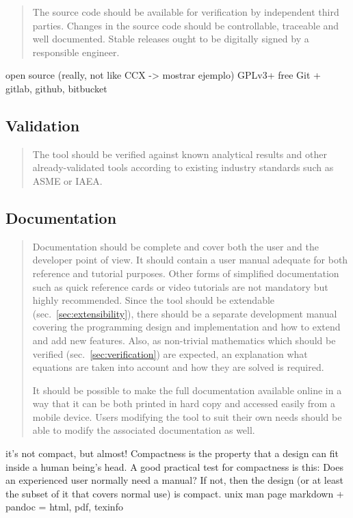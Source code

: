 \documentclass[
  american,
]{article}
\begin{document}
\begin{quote}
The source code should be available for verification by independent
third parties. Changes in the source code should be controllable,
traceable and well documented. Stable releases ought to be digitally
signed by a responsible engineer.
\end{quote}

open source (really, not like CCX -\textgreater{} mostrar ejemplo)
GPLv3+ free Git + gitlab, github, bitbucket

\hypertarget{validation}{%
\subsection{Validation}\label{validation}}

\begin{quote}
The tool should be verified against known analytical results and other
already-validated tools according to existing industry standards such as
ASME or IAEA.
\end{quote}

\hypertarget{sec:documentation}{%
\subsection{Documentation}\label{sec:documentation}}

\begin{quote}
Documentation should be complete and cover both the user and the
developer point of view. It should contain a user manual adequate for
both reference and tutorial purposes. Other forms of simplified
documentation such as quick reference cards or video tutorials are not
mandatory but highly recommended. Since the tool should be extendable
(sec.~\ref{sec:extensibility}), there should be a separate development
manual covering the programming design and implementation and how to
extend and add new features. Also, as non-trivial mathematics which
should be verified (sec.~\ref{sec:verification}) are expected, an
explanation what equations are taken into account and how they are
solved is required.

It should be possible to make the full documentation available online in
a way that it can be both printed in hard copy and accessed easily from
a mobile device. Users modifying the tool to suit their own needs should
be able to modify the associated documentation as well.
\end{quote}

it's not compact, but almost! Compactness is the property that a design
can fit inside a human being's head. A good practical test for
compactness is this: Does an experienced user normally need a manual? If
not, then the design (or at least the subset of it that covers normal
use) is compact. unix man page markdown + pandoc = html, pdf, texinfo
\end{document}
